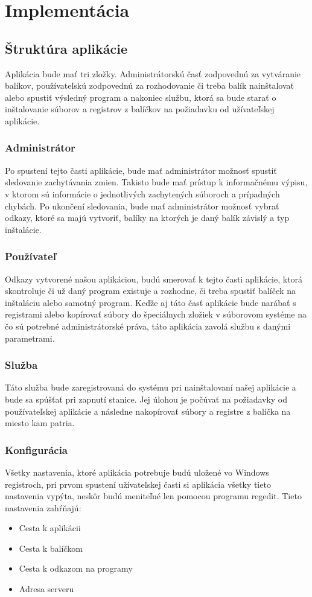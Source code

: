 \chapter{Implementácia}

\section{Štruktúra aplikácie}

Aplikácia bude mať tri zložky. Administrátorskú časť zodpovednú za vytváranie balíkov, používateľskú zodpovednú za rozhodovanie či treba balík nainštalovať alebo spustiť výsledný program a nakoniec službu, ktorá sa bude starať o inštalovanie súborov a registrov z balíčkov na požiadavku od užívateľskej aplikácie.
\subsection{Administrátor}
Po spustení tejto časti aplikácie, bude mať administrátor možnosť spustiť sledovanie zachytávania zmien. Takisto bude mať prístup k informačnému výpisu, v ktorom sú informácie o jednotlivých zachytených súboroch a prípadných chybách. Po ukončení sledovania, bude mať administrátor možnosť vybrať odkazy, ktoré sa majú vytvoriť, balíky na ktorých je daný balík závislý a typ inštalácie.
\subsection{Používateľ}
Odkazy vytvorené našou aplikáciou, budú smerovať k tejto časti aplikácie, ktorá skontroluje či už daný program existuje a rozhodne, či treba spustiť balíček na inštaláciu alebo samotný program. Keďže aj táto časť aplikácie bude narábať s registrami alebo kopírovať súbory do špeciálnych zložiek v súborovom systéme na čo sú potrebné administrátorské práva, táto aplikácia zavolá službu s danými parametrami.
\subsection{Služba}
Táto služba bude zaregistrovaná do systému pri nainštalovaní našej aplikácie a bude sa spúšťať pri zapnutí stanice. Jej úlohou je počúvať na požiadavky od používateľskej aplikácie a následne nakopírovať súbory a registre z balíčka na miesto kam patria.
\subsection{Konfigurácia}
Všetky nastavenia, ktoré aplikácia potrebuje budú uložené vo Windows registroch, pri prvom spustení užívateľskej časti si aplikácia všetky tieto nastavenia vypýta, neskôr budú meniteľné len pomocou programu regedit. Tieto nastavenia zahŕňajú:
\begin{itemize}
\item Cesta k aplikácii
\item Cesta k balíčkom
\item Cesta k odkazom na programy
\item Adresa serveru
\end{itemize}


